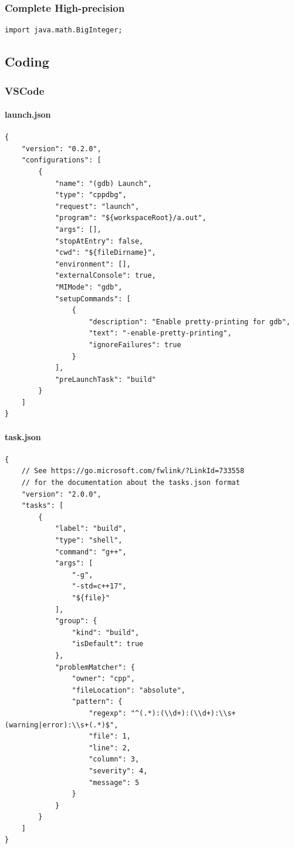 \documentclass[twoside]{article}
\begin{document}
\subsubsection{Complete High-precision}
\begin{lstlisting}
import java.math.BigInteger;\end{lstlisting}
\subsection{Coding}
\subsubsection{VSCode}
\paragraph{launch.json}
\begin{lstlisting}
{
    "version": "0.2.0",
    "configurations": [
        {
            "name": "(gdb) Launch",
            "type": "cppdbg",
            "request": "launch",
            "program": "${workspaceRoot}/a.out",
            "args": [],
            "stopAtEntry": false,
            "cwd": "${fileDirname}",
            "environment": [],
            "externalConsole": true,
            "MIMode": "gdb",
            "setupCommands": [
                {
                    "description": "Enable pretty-printing for gdb",
                    "text": "-enable-pretty-printing",
                    "ignoreFailures": true
                }
            ],
            "preLaunchTask": "build"
        }
    ]
}
\end{lstlisting}

\paragraph{task.json}
\begin{lstlisting}
{
    // See https://go.microsoft.com/fwlink/?LinkId=733558
    // for the documentation about the tasks.json format
    "version": "2.0.0",
    "tasks": [
        {
            "label": "build",
            "type": "shell",
            "command": "g++",
            "args": [
                "-g",
                "-std=c++17",
                "${file}"
            ],
            "group": {
                "kind": "build",
                "isDefault": true
            },
            "problemMatcher": {
                "owner": "cpp",
                "fileLocation": "absolute",
                "pattern": {
                    "regexp": "^(.*):(\\d+):(\\d+):\\s+(warning|error):\\s+(.*)$",
                    "file": 1,
                    "line": 2,
                    "column": 3,
                    "severity": 4,
                    "message": 5
                }
            }
        }
    ]
}
\end{lstlisting}
\end{document}

